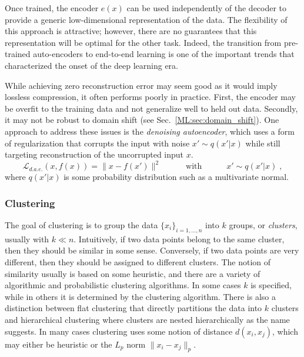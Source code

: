 Once trained, the encoder $e(x)$ can be used independently of the decoder to provide a generic low-dimensional representation of the data. The flexibility of this approach is attractive; however, there are no guarantees that this representation will be optimal for the other task. Indeed, the transition from pre-trained auto-encoders to end-to-end learning is one of the important trends that characterized the onset of the deep learning era.

While achieving zero reconstruction error may seem good as it would imply lossless compression, it often performs poorly in practice. First, the encoder may be overfit to the training data and not generalize well to held out data. Secondly, it may not be robust to domain shift (see Sec.~\ref{ML:sec:domain_shift}). One approach to address these issues is the \textit{denoising autoencoder}, which uses a form of regularization that corrupts the input with noise $x' \sim q(x' | x)$ while still targeting reconstruction of the uncorrupted input $x$. 
\begin{equation}
    \label{ML:eq:reconstruction_error_DAE}
    \mathcal{L}_{d.a.e.}(x, f(x)) = \lVert x - f(x') \rVert^2 \hspace{3em} \textrm{with} \hspace{3em} x' \sim q(x' | x)\;,
\end{equation}
where $q(x' | x)$ is some probability distribution such as a multivariate normal. 



\subsubsection{Clustering}\label{ML:sec:clustering}

The goal of clustering is to group the data $\{x_i\}_{i=1,\dots,n}$ into $k$ groups, or \textit{clusters}, usually with $k \ll n$. Intuitively, if two data points belong to the same cluster, then they should be similar in some sense. Conversely, if two data points are very different, then they should be assigned to different clusters. The notion of similarity usually is based on some heuristic, and there are a variety of algorithmic and probabilistic clustering algorithms. In some cases $k$ is specified, while in others it is determined by the clustering algorithm. There is also a distinction between flat clustering that directly partitions the data into $k$ clusters and hierarchical clustering where clusters are nested hierarchically as the name suggests.  In many cases clustering uses some notion of distance $d(x_i, x_j)$, which may either be heuristic or the $L_p$ norm $\lVert x_i - x_j \rVert_p$. 

